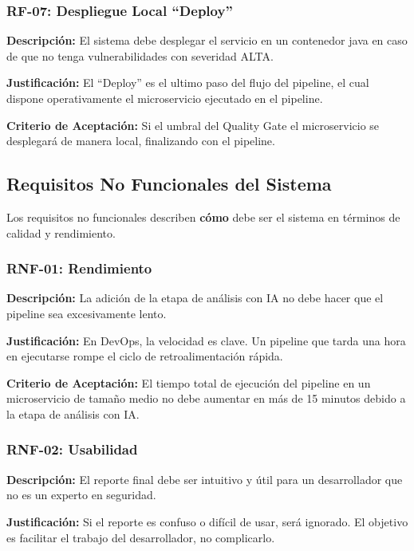 \subsubsection{RF-07: Despliegue Local ``Deploy''}

\textbf{Descripción:} El sistema debe desplegar el servicio en un contenedor java en caso de que no tenga vulnerabilidades con severidad ALTA.

\textbf{Justificación:} El ``Deploy'' es el ultimo paso del flujo del pipeline, el cual dispone operativamente el microservicio ejecutado en el pipeline.

\textbf{Criterio de Aceptación:} Si el umbral del Quality Gate el microservicio se desplegará de manera local, finalizando con el pipeline.

\subsection{Requisitos No Funcionales del Sistema}

Los requisitos no funcionales describen \textbf{cómo} debe ser el sistema en términos de calidad y rendimiento.

\subsubsection{RNF-01: Rendimiento}

\textbf{Descripción:} La adición de la etapa de análisis con IA no debe hacer que el pipeline sea excesivamente lento.

\textbf{Justificación:} En DevOps, la velocidad es clave. Un pipeline que tarda una hora en ejecutarse rompe el ciclo de retroalimentación rápida.

\textbf{Criterio de Aceptación:} El tiempo total de ejecución del pipeline en un microservicio de tamaño medio no debe aumentar en más de 15 minutos debido a la etapa de análisis con IA.

\subsubsection{RNF-02: Usabilidad}

\textbf{Descripción:} El reporte final debe ser intuitivo y útil para un desarrollador que no es un experto en seguridad.

\textbf{Justificación:} Si el reporte es confuso o difícil de usar, será ignorado. El objetivo es facilitar el trabajo del desarrollador, no complicarlo.

